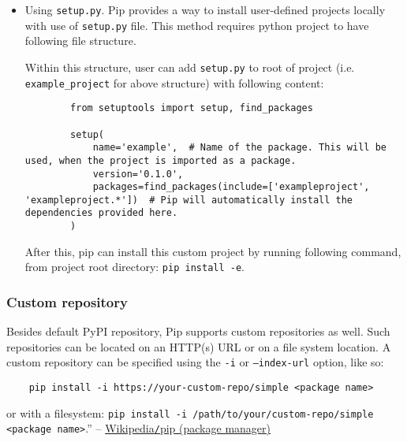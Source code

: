 \documentclass{article}
\begin{document}
\begin{itemize}
	\item {\sf Using {\tt setup.py}.} Pip provides a way to install user-defined projects locally with use of {\tt setup.py} file. This method requires python project to have following {\sf file structure}.
	
	Within this structure, user can add {\tt setup.py} to root of project (i.e. \verb|example_project| for above structure) with following content:
	\begin{verbatim}
		from setuptools import setup, find_packages
		
		setup(
		    name='example',  # Name of the package. This will be used, when the project is imported as a package.
		    version='0.1.0',
		    packages=find_packages(include=['exampleproject', 'exampleproject.*'])  # Pip will automatically install the dependencies provided here.
		)
	\end{verbatim}
	After this, pip can install this custom project by running following command, from project root directory: {\tt pip install -e}.
\end{itemize}

\subsubsection{Custom repository}
Besides default PyPI repository, Pip supports custom repositories as well. Such repositories can be located on an HTTP(s) URL or on a file system location. A custom repository can be specified using the {\tt-i} or {\tt--index-url} option, like so:
\begin{verbatim}
	pip install -i https://your-custom-repo/simple <package name>
\end{verbatim}
or with a filesystem: \verb|pip install -i /path/to/your/custom-repo/simple <package name>|.'' -- \href{https://en.wikipedia.org/wiki/Pip_(package_manager)}{Wikipedia{\tt/}pip (package manager)}


\printbibliography[heading=bibintoc]
	
\end{document}
